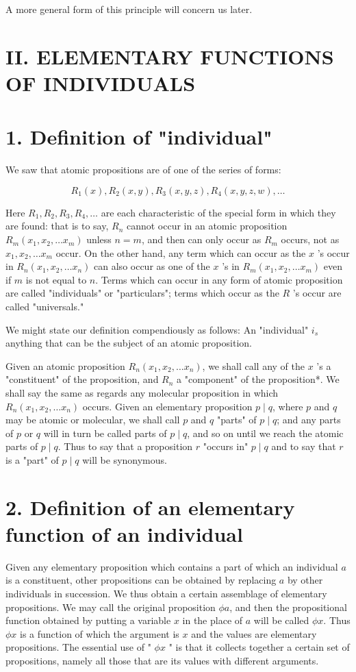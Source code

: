 \documentclass[10pt]{article}
\begin{document}
A more general form of this principle will concern us later.

\section*{II. ELEMENTARY FUNCTIONS OF INDIVIDUALS}
\section*{1. Definition of "individual"}
We saw that atomic propositions are of one of the series of forms:

$$
R_{1}(x), R_{2}(x, y), R_{3}(x, y, z), R_{4}(x, y, z, w), \ldots
$$

Here $R_{1}, R_{2}, R_{3}, R_{4}, \ldots$ are each characteristic of the special form in which they are found: that is to say, $R_{n}$ cannot occur in an atomic proposition $R_{m}\left(x_{1}, x_{2}, \ldots x_{m}\right)$ unless $n=m$, and then can only occur as $R_{m}$ occurs, not as $x_{1}, x_{2}, \ldots x_{m}$ occur. On the other hand, any term which can occur as the $x$ 's occur in $R_{n}\left(x_{1}, x_{2}, \ldots x_{n}\right)$ can also occur as one of the $x$ 's in $R_{m}\left(x_{1}, x_{2}, \ldots x_{m}\right)$ even if $m$ is not equal to $n$. Terms which can occur in any form of atomic proposition are called "individuals" or "particulars"; terms which occur as the $R$ 's occur are called "universals."

We might state our definition compendiously as follows: An "individual" $i_{s}$ anything that can be the subject of an atomic proposition.

Given an atomic proposition $R_{n}\left(x_{1}, x_{2}, \ldots x_{n}\right)$, we shall call any of the $x$ 's a "constituent" of the proposition, and $R_{n}$ a "component" of the proposition*. We shall say the same as regards any molecular proposition in which $R_{n}\left(x_{1}, x_{2}, \ldots x_{n}\right)$ occurs. Given an elementary proposition $p \mid q$, where $p$ and $q$ may be atomic or molecular, we shall call $p$ and $q$ "parts" of $p \mid q$; and any parts of $p$ or $q$ will in turn be called parts of $p \mid q$, and so on until we reach the atomic parts of $p \mid q$. Thus to say that a proposition $r$ "occurs in" $p \mid q$ and to say that $r$ is a "part" of $p \mid q$ will be synonymous.

\section*{2. Definition of an elementary function of an individual}
Given any elementary proposition which contains a part of which an individual $a$ is a constituent, other propositions can be obtained by replacing $a$ by other individuals in succession. We thus obtain a certain assemblage of elementary propositions. We may call the original proposition $\phi a$, and then the propositional function obtained by putting a variable $x$ in the place of $a$ will be called $\phi x$. Thus $\phi x$ is a function of which the argument is $x$ and the values are elementary propositions. The essential use of " $\phi x$ " is that it collects together a certain set of propositions, namely all those that are its values with different arguments.
\end{document}
